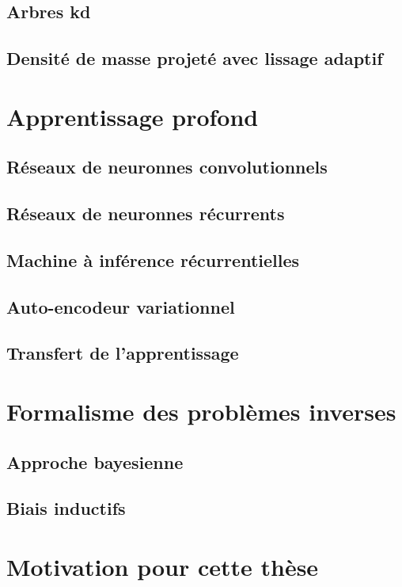 \subsection{Arbres kd}

\subsection{Densité de masse projeté avec lissage adaptif}


\section{Apprentissage profond}

\subsection{Réseaux de neuronnes convolutionnels}

\subsection{Réseaux de neuronnes récurrents}

\subsection{Machine à inférence récurrentielles}

\subsection{Auto-encodeur variationnel}

\subsection{Transfert de l'apprentissage}


\section{Formalisme des problèmes inverses}

\subsection{Approche bayesienne}

\subsection{Biais inductifs}

\subsection{}


\section{Motivation pour cette thèse}



